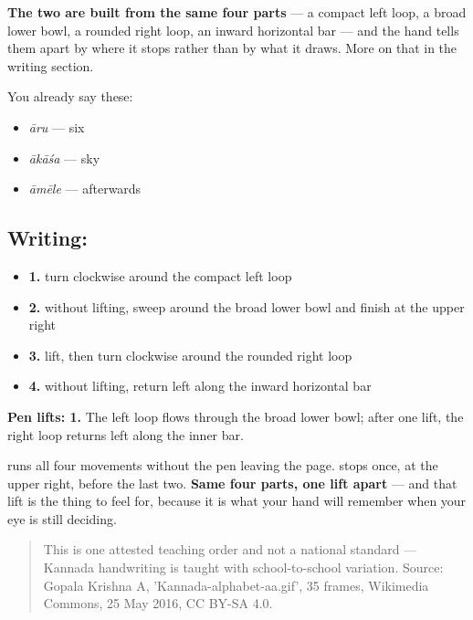 \textbf{The two are built from the same four parts} — a compact left loop, a broad lower bowl, a rounded right loop, an inward horizontal bar — and the hand tells them apart by where it stops rather than by what it draws. More on that in the writing section.

You already say these:

\begin{itemize}
\raggedright
  \item \textbf{} \emph{āru} — six
  \item \textbf{} \emph{ākāśa} — sky
  \item \textbf{} \emph{āmēle} — afterwards
\end{itemize}

\subsection*{Writing: }

\begin{itemize}
\raggedright
  \item \textbf{1.} turn clockwise around the compact left loop
  \item \textbf{2.} without lifting, sweep around the broad lower bowl and finish at the upper right
  \item \textbf{3.} lift, then turn clockwise around the rounded right loop
  \item \textbf{4.} without lifting, return left along the inward horizontal bar
\end{itemize}

\textbf{Pen lifts: 1.} The left loop flows through the broad lower bowl; after one lift, the right loop returns left along the inner bar.

 runs all four movements without the pen leaving the page.  stops once, at the upper right, before the last two. \textbf{Same four parts, one lift apart} — and that lift is the thing to feel for, because it is what your hand will remember when your eye is still deciding.

\begin{quote}
This is one attested teaching order and not a national standard — Kannada handwriting is taught with school-to-school variation. Source: Gopala Krishna A, 'Kannada-alphabet-aa.gif', 35 frames, Wikimedia Commons, 25 May 2016, CC BY-SA 4.0.
\end{quote}


